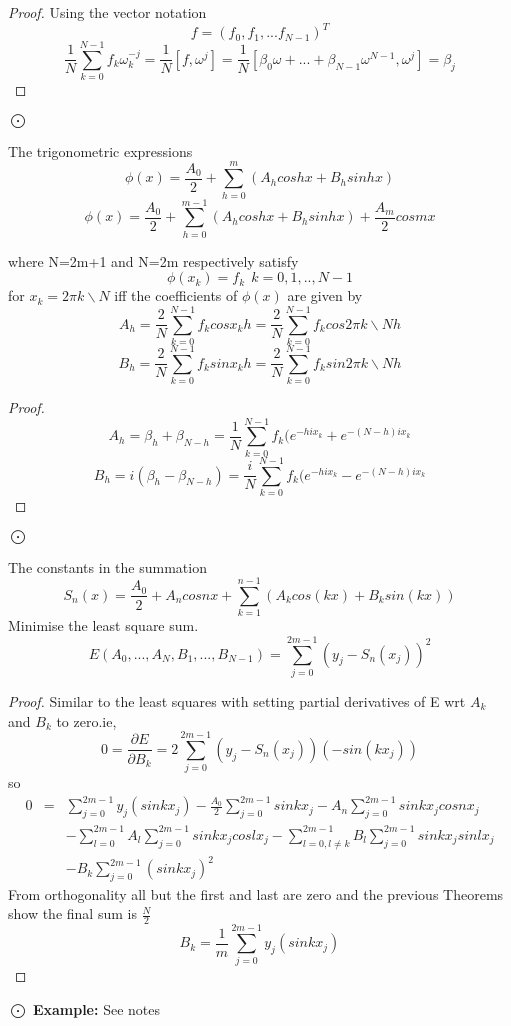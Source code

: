 \begin{proof}
Using the vector notation
\[f=(f_0,f_1,...f_{N-1})^{T}\]
\[\frac{1}{N}\sum_{k=0}^{N-1}f_{k}\omega^{-j}_k=\frac{1}{N}[f,\omega^j]
=\frac{1}{N}[\beta_0\omega+...+\beta_{N-1}\omega^{N-1},\omega^{j}]=\beta_j
\]
\end{proof}$\bigodot$

\begin{theorem}
The trigonometric expressions 
\[
\phi(x) = \frac{A_0}{2} + \sum^{m}_{h=0} (A_h cos hx + B_h sin hx) \]
\[
\phi(x) = \frac{A_0}{2} + \sum^{m-1}_{h=0} (A_h cos hx + B_h sin hx)+\frac{A_{m}}{2}cosmx \]

where N=2m+1 and N=2m respectively satisfy
\[\phi(x_k) = f_k \ \ k=0,1,..,N-1 \]
for $x_k=2 \pi k \backslash N $ iff the coefficients of $\phi(x)$ are given by
\[ A_h = \frac{2}{N} \sum_{k=0}^{N-1} f_k cos x_k h = \frac{2}{N} \sum_{k=0}^{N-1} f_k cos 2\pi k \backslash N h \]
\[
B_h = \frac{2}{N} \sum_{k=0}^{N-1} f_k sin x_k h = \frac{2}{N} \sum_{k=0}^{N-1} f_k sin 2\pi k \backslash N h \]
\end{theorem}
\begin{proof}
\[A_h=\beta_h+\beta_{N-h} = \frac{1}{N} \sum_{k=0}^{N-1}f_k(e^{-hix_{k}}+e^{-(N-h)ix_k} \]
\[B_h=i(\beta_h-\beta_{N-h}) = \frac{i}{N} \sum_{k=0}^{N-1}f_k(e^{-hix_{k}}-e^{-(N-h)ix_k} \]
\end{proof}$\bigodot$
\begin{theorem}
The constants in the summation
\[S_n(x) = \frac{A_0}{2}+A_n cosnx +\sum_{k=1}^{n-1}(A_kcos(kx)+B_ksin(kx)) \]
Minimise the least square sum.
\[
E(A_0,...,A_N,B_1,...,B_{N-1}) = \sum_{j=0}^{2m-1}(y_j-S_n(x_j))^2 \]

\end{theorem}
\begin{proof}
Similar to the least squares with setting partial derivatives of E wrt $A_k$ and
$B_k$ to zero.ie,
\[
0=\frac{\partial E}{\partial B_k} = 2\sum_{j=0}^{2m-1}(y_j-S_n(x_j))(-sin(kx_j))
\]
so
\begin{eqnarray*}
0&=&\sum_{j=0}^{2m-1}y_j(sinkx_j) - \frac{A_0}{2}\sum_{j=0}^{2m-1}sinkx_j
-A_n\sum_{j=0}^{2m-1}sinkx_jcosnx_j \\
& &- \sum_{l=0}^{2m-1}A_l\sum_{j=0}^{2m-1}sinkx_jcoslx_j 
-\sum_{l=0,l\not=k}^{2m-1}B_l \sum_{j=0}^{2m-1}sinkx_jsinlx_j\\
& & -B_k\sum_{j=0}^{2m-1}(sinkx_j)^2
\end{eqnarray*}
From orthogonality all but the first and last are zero and the previous Theorems
show the final sum is $\frac{N}{2}$
\[
B_k=\frac{1}{m}\sum_{j=0}^{2m-1}y_j(sinkx_j)\] 
\end{proof}$\bigodot$
\textbf{Example:}
See notes
